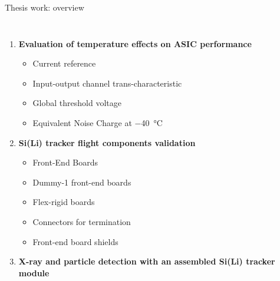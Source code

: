 \documentclass[aspectratio=169,xcolor=dvipsnames]{beamer} %
\begin{document}

\begin{frame}{Thesis work: overview}
    \addtolength{\leftmargini}{\labelsep}
    \begin{columns}
        \vspace{-0.2cm}
        \fontsize{11pt}{1}\selectfont
        \pause
        \begin{enumerate}
            \setlength\itemsep{1em}
            \fontsize{10pt}{1}\selectfont
            \item \textbf{Evaluation of temperature effects on ASIC performance}
            \begin{itemize}
                \fontsize{8.5pt}{1}\selectfont
                \setlength\itemsep{0.3em}
                \item Current reference
                \item Input-output channel trans-characteristic
                \item Global threshold voltage
                \item Equivalent Noise Charge at \SI{-40}{\celsius}
            \end{itemize}\pause
            \fontsize{10pt}{1}\selectfont
            \item \textbf{Si(Li) tracker flight components validation}
            \begin{itemize}
                \fontsize{8.5pt}{1}\selectfont
                \setlength\itemsep{0.3em}
                \item Front-End Boards
                \item Dummy-1 front-end boards
                \item Flex-rigid boards
                \item Connectors for termination
                \item Front-end board shields
            \end{itemize}\pause
            \fontsize{10pt}{1}\selectfont
            \item \textbf{X-ray and particle detection with an assembled Si(Li) tracker module}
            \begin{itemize}
                \fontsize{8.5pt}{1}\selectfont

\end{itemize}
\end{enumerate}
\end{columns}
\end{frame}
\end{document}
